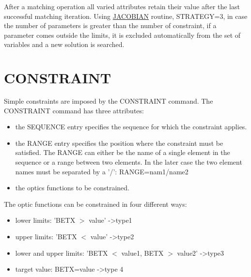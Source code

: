 After a matching operation all varied attributes retain their
value after the last successful matching iteration. Using
\href{match_xeq.html#jacobian}{JACOBIAN} routine, STRATEGY=3, in case
the number of parameters is greater than the number of constraint, if a
parameter comes outside the limits, it is excluded automatically from
the set of variables and a new solution is searched.  




%

\section{CONSTRAINT}
\label{sec:constaint}

Simple constraints are imposed by the CONSTRAINT command. The CONSTRAINT
command has three attributes:   
\begin{itemize}
 \item  the SEQUENCE entry specifies the sequence for which the
   constraint applies.  
 \item  the RANGE entry specifies the position where the
   constraint must be satisfied. The RANGE can either be the name
   of a single element in the sequence or a range between two
   elements. In the later case the two element names must be
   separated by a '/': RANGE=nam1/name2  
 \item the optics functions to be constrained. 
\end{itemize} 

The optic functions can be constrained in four different ways: 
\begin{itemize}
 \item lower limits: 'BETX $>$ value' -\textgreater type1 
 \item upper limits: 'BETX $<$ value' -\textgreater type2 
 \item lower and upper limits: 'BETX $<$ value1, 
   BETX $>$ value2' -\textgreater type3  
 \item target value: BETX=value -\textgreater type 4 
\end{itemize} 


